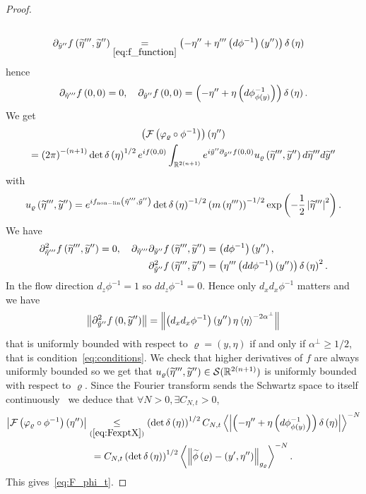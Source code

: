 \documentclass[10pt]{amsart}
\theoremstyle{definition}\newtheorem{defi}[theo]{Definition}\newtheorem{rema}[theo]{Remark}\newtheorem{exam}[theo]{Example}\newtheorem{exem}[theo]{Example}\newtheorem{nota}[theo]{Notation}
\newcommand*\ineq[1]{\underset{(#1)}{\leq}}
\newcommand{\clS}{\mathcal{S}}
\newcommand{\clF}{\mathcal{F}}
\newcommand{\nonlin}{\mathrm{non-lin}}
\newcommand{\bbR}{\mathbb{R}}
\let\oldtilde\tilde
\renewcommand*{\tilde}[1]{\mathchoice{\widetilde{#1}}{\widetilde{#1}}{\oldtilde{#1}}{\oldtilde{#1}}}
\let\oldexists\exists
\renewcommand*{\exists}{\mathrel{\oldexists}}
\let\oldforall\forall
\renewcommand*{\forall}{\mathrel{\oldforall}}
\begin{document}
\begin{proof}
\begin{align*}
\\
\partial_{\tilde{y}''}f\left(\tilde{\eta}''',\tilde{y}''\right) &\underset{\eqref{eq:f_function}}{=}\left(-\eta''+\eta'''\left(d\phi^{-1}\right)\left(y''\right)\right)\delta\left(\eta\right)
\end{align*}
hence
\[
\partial_{\tilde{\eta}'''}f\left(0,0\right)=0,\quad\partial_{\tilde{y}''}f\left(0,0\right)=\left(-\eta''+\eta\left(d\phi_{\phi\left(y\right)}^{-1}\right)\right)\delta\left(\eta\right).
\]
We get
\begin{multline}\label{eq:FexptX}
\left(\clF\left(\varphi_{\varrho}\circ\phi^{-1}\right)\right)\left(\eta''\right)\\
=\left(2\pi\right)^{-\left(n+1\right)}\det \delta\left(\eta\right)^{1/2}e^{if\left(0,0\right)}\int_{\bbR^{2\left(n+1\right)}}e^{i\tilde{y}''\partial_{\tilde{y}''}f\left(0,0\right)}u_{\varrho}\left(\tilde{\eta}''',\tilde{y}''\right)d\tilde{\eta}'''d\tilde{y}''
\end{multline}
with
\[
u_{\varrho}\left(\tilde{\eta}''',\tilde{y}''\right)=e^{if_{\nonlin}\left(\tilde{\eta}''',\tilde{y}''\right)}\det \delta\left(\eta\right)^{-1/2}\left(m\left(\eta'''\right)\right)^{-1/2}\exp\left(-\frac{1}{2}\left|\tilde{\eta}'''\right|^{2}\right).
\]
We have
\begin{align*}
\partial_{\tilde{\eta}'''}^{2}f\left(\tilde{\eta}''',\tilde{y}''\right)=0,\quad\partial_{\tilde{\eta}'''}\partial_{\tilde{y}''}f\left(\tilde{\eta}''',\tilde{y}''\right) &=\left(d\phi^{-1}\right)\left(y''\right),\\
\partial_{\tilde{y}''}^{2}f\left(\tilde{\eta}''',\tilde{y}''\right) &=\left(\eta'''\left(dd\phi^{-1}\right)\left(y''\right)\right)\delta\left(\eta\right)^{2}.
\end{align*}
In the flow direction $d_{z}\phi^{-1}=1$ so $dd_{z}\phi^{-1}=0$. Hence only $d_{x}d_{x}\phi^{-1}$ matters and we have
\[
\left\Vert \partial_{\tilde{y}''}^{2}f\left(0,\tilde{y}''\right)\right\Vert =\left\Vert \left(d_{x}d_{x}\phi^{-1}\right)\left(y''\right)\eta\left\langle \eta\right\rangle ^{-2\alpha^{\perp}}\right\Vert
\]
that is uniformly bounded with respect to $\varrho=(y,\eta)$ if and only if $\alpha^{\perp}\geq1/2$, that is condition~\eqref{eq:conditions}. We check that higher derivatives of $f$ are always uniformly bounded so we get that $u_{\varrho}(\tilde{\eta}''',\tilde{y}'')\in\clS(\bbR^{2(n+1)})$ is uniformly bounded with respect to $\varrho$. Since the Fourier transform sends the Schwartz space to itself continuously~\cite[p.~222]{taylor_tome1} we deduce that $\forall N>0,\exists C_{N,t}>0$,
\begin{align*}
\left|\clF\left(\varphi_{\varrho}\circ\phi^{-1}\right)\left(\eta''\right)\right| & \ineq{\ref{eq:FexptX}}\left(\det \delta\left(\eta\right)\right)^{1/2}C_{N,t}\left\langle \left|\left(-\eta''+\eta\left(d\phi_{\phi\left(y\right)}^{-1}\right)\right)\delta\left(\eta\right)\right|\right\rangle ^{-N}\\
&\mkern8mu =C_{N,t}\left(\det \delta\left(\eta\right)\right)^{1/2}\left\langle \left\Vert \tilde{\phi}\left(\varrho\right)-\left(y',\eta''\right)\right\Vert _{g_{\varrho}}\right\rangle ^{-N}.
\end{align*}
This gives~\eqref{eq:F_phi_t}.
\end{proof}
\end{document}
